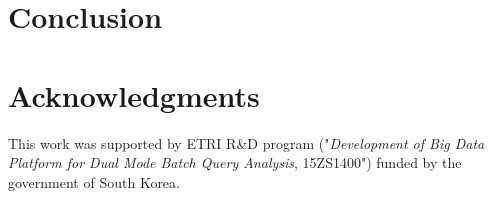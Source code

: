 \documentclass[conference]{IEEEtran}
\begin{document}
\section{Conclusion}
\label{sc:Conclusion}

%

\section*{Acknowledgments}
This work was supported by ETRI R\&D program ("\textit{Development of Big Data Platform for Dual Mode Batch Query Analysis}, 15ZS1400") funded by the government of South Korea.


\end{document}
